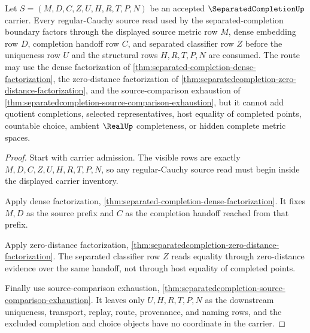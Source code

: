 \begin{theorem}
\label{thm:separatedcompletion-regular-cauchy-source-route}
Let $S=(M,D,C,Z,U,H,R,T,P,N)$ be an accepted $\SeparatedCompletionUp$ carrier. Every regular-Cauchy source read used by the separated-completion boundary factors through the displayed source metric row $M$, dense embedding row $D$, completion handoff row $C$, and separated classifier row $Z$ before the uniqueness row $U$ and the structural rows $H,R,T,P,N$ are consumed. The route may use the dense factorization of \autoref{thm:separated-completion-dense-factorization}, the zero-distance factorization of \autoref{thm:separatedcompletion-zero-distance-factorization}, and the source-comparison exhaustion of \autoref{thm:separatedcompletion-source-comparison-exhaustion}, but it cannot add quotient completions, selected representatives, host equality of completed points, countable choice, ambient $\RealUp$ completeness, or hidden complete metric spaces.
\end{theorem}
\begin{proof}
Start with carrier admission. The visible rows are exactly $M,D,C,Z,U,H,R,T,P,N$, so any regular-Cauchy source read must begin inside the displayed carrier inventory.

Apply dense factorization, \autoref{thm:separated-completion-dense-factorization}. It fixes $M,D$ as the source prefix and $C$ as the completion handoff reached from that prefix.

Apply zero-distance factorization, \autoref{thm:separatedcompletion-zero-distance-factorization}. The separated classifier row $Z$ reads equality through zero-distance evidence over the same handoff, not through host equality of completed points.

Finally use source-comparison exhaustion, \autoref{thm:separatedcompletion-source-comparison-exhaustion}. It leaves only $U,H,R,T,P,N$ as the downstream uniqueness, transport, replay, route, provenance, and naming rows, and the excluded completion and choice objects have no coordinate in the carrier.
\end{proof}

